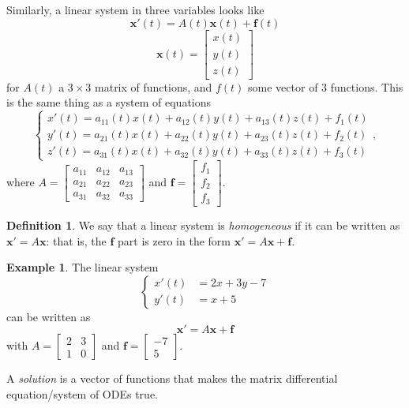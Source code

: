 \documentclass[12pt]{amsart}
\numberwithin{equation}{section}
\theoremstyle{plain} %
\theoremstyle{definition}
\newtheorem{defn}[equation]{Definition}
\newtheorem{ex}[equation]{Example}
\theoremstyle{remark}
\begin{document}
Similarly, a linear system in three variables looks like 
\[ \mathbf{x'}(t) = A(t) \mathbf{x}(t) + \mathbf{f}(t)\]
\[ \mathbf{x}(t) = \begin{bmatrix} x(t) \\ y(t) \\ z(t) \end{bmatrix}\]
for $A(t)$ a $3\times 3$ matrix of functions, and $f(t)$ some vector of $3$ functions. This is the same thing as a system of equations
\[ \begin{cases} x'(t) = a_{11}(t) x(t) + a_{12}(t) y(t) + a_{13}(t) z(t) + f_1(t) \\
y'(t) = a_{21}(t) x(t) + a_{22}(t) y(t) + a_{23}(t) z(t) + f_2(t) \\
z'(t) = a_{31}(t) x(t) + a_{32}(t) y(t) + a_{33}(t) z(t) + f_3(t) 
\end{cases},\]
where $A= \begin{bmatrix} a_{11} & a_{12} & a_{13} \\  a_{21} & a_{22} & a_{23} \\  a_{31} & a_{32} & a_{33}\end{bmatrix}$ and $\mathbf{f} = \begin{bmatrix} f_1 \\ f_2 \\ f_3\end{bmatrix}$.

\begin{defn} We say that a linear system is \emph{homogeneous} if it can be written as $\mathbf{x'} = A \mathbf{x}$: that is, the $\mathbf{f}$ part is zero in the form $\mathbf{x'} = A\mathbf{x} + \mathbf{f}$.
\end{defn}

\begin{ex}
The linear system
\[ \begin{cases} x'(t) &= 2 x + 3y -7 \\
y'(t) &= x + 5\end{cases}\]
can be written as
\[  \mathbf{x'} = A \mathbf{x} + \mathbf{f}\]
with $A=\begin{bmatrix} 2 & 3 \\ 1 & 0\end{bmatrix}$ and $\mathbf{f} = \begin{bmatrix} -7 \\ 5\end{bmatrix}$.
\end{ex}

A \emph{solution} is a vector of functions that makes the matrix differential equation/system of ODEs true.
\end{document}
